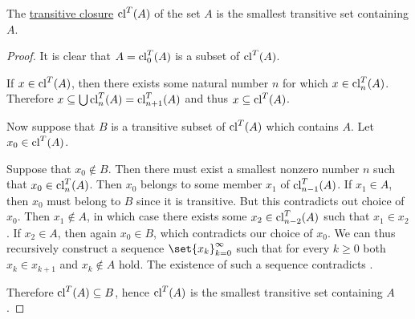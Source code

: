 \begin{proposition}\label{thm:transitive_closure_of_a_set}
  The \hyperref[def:transitive_closure_of_a_set]{transitive closure} \( \operatorname{cl}^T(A) \) of the set \( A \) is the smallest transitive set containing \( A \).
\end{proposition}
\begin{proof}
  It is clear that \( A = \operatorname{cl}_0^T(A) \) is a subset of \( \operatorname{cl}^T(A) \).

  If \( x \in \operatorname{cl}^T(A) \), then there exists some natural number \( n \) for which \( x \in \operatorname{cl}_n^T(A) \). Therefore \( x \subseteq \bigcup \operatorname{cl}_n^T(A) = \operatorname{cl}_{n+1}^T(A) \) and thus \( x \subseteq \operatorname{cl}^T(A) \).

  Now suppose that \( B \) is a transitive subset of \( \operatorname{cl}^T(A) \) which contains \( A \). Let \( x_0 \in \operatorname{cl}^T(A) \).

  Suppose that \( x_0 \not\in B \). Then there must exist a smallest nonzero number \( n \) such that \( x_0 \in \operatorname{cl}_n^T(A) \). Then \( x_0 \) belongs to some member \( x_1 \) of \( \operatorname{cl}_{n-1}^T(A) \). If \( x_1 \in A \), then \( x_0 \) must belong to \( B \) since it is transitive. But this contradicts out choice of \( x_0 \). Then \( x_1 \not\in A \), in which case there exists some \( x_2 \in \operatorname{cl}_{n-2}^T(A) \) such that \( x_1 \in x_2 \). If \( x_2 \in A \), then again \( x_0 \in B \), which contradicts our choice of \( x_0 \). We can thus recursively construct a sequence \( \set{ x_k }_{k=0}^\infty \) such that for every \( k \geq 0 \) both \( x_k \in x_{k+1} \) and \( x_k \not\in A \) hold. The existence of such a sequence contradicts .

  Therefore \( \operatorname{cl}^T(A) \subseteq B \), hence \( \operatorname{cl}^T(A) \) is the smallest transitive set containing \( A \).
\end{proof}

